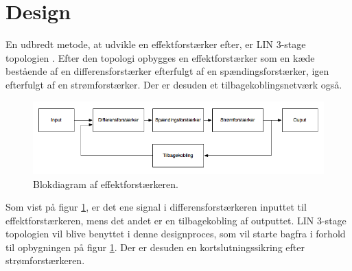 \section{Design}
En udbredt metode, at udvikle en effektforstærker efter, er LIN 3-stage topologien \cite{ael-mm20}. Efter den topologi opbygges en effektforstærker som en kæde bestående af en differensforstærker efterfulgt af en spændingsforstærker, igen efterfulgt af en strømforstærker. Der er desuden et tilbagekoblingsnetværk også. 

\begin{figure}[h]
\centering
\includegraphics[scale=0.5]{teknisk/effektforstaerker/blokdiagram-effektforstaerker.png}
\caption{Blokdiagram af effektforstærkeren.}
\label{fig:lin_effektforstaerker}
\end{figure}

Som vist på figur \ref{fig:lin_effektforstaerker}, er det ene signal i differensforstærkeren inputtet til effektforstærkeren, mens det andet er en tilbagekobling af outputtet. LIN 3-stage topologien vil blive benyttet i denne designproces, som vil starte bagfra i forhold til opbygningen på figur \ref{fig:lin_effektforstaerker}. Der er desuden en kortslutningssikring efter strømforstærkeren.